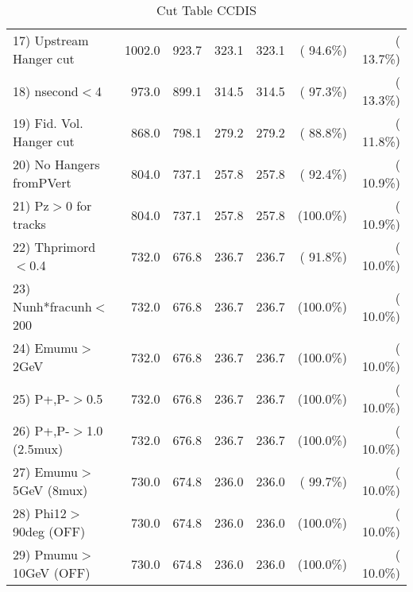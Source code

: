 \begin{table}[h!]
\begin{tabular}{||l||r|r|r|r|r|r||}
 17) Upstream Hanger cut  &       1002.0 &        923.7 &        323.1 &        323.1 & ( 94.6\%) & ( 13.7\%) \\
 18) nsecond$<$4          &        973.0 &        899.1 &        314.5 &        314.5 & ( 97.3\%) & ( 13.3\%) \\
 19) Fid. Vol. Hanger cut &        868.0 &        798.1 &        279.2 &        279.2 & ( 88.8\%) & ( 11.8\%) \\
 20) No Hangers fromPVert &        804.0 &        737.1 &        257.8 &        257.8 & ( 92.4\%) & ( 10.9\%) \\
 21) Pz$>$0 for tracks    &        804.0 &        737.1 &        257.8 &        257.8 & (100.0\%) & ( 10.9\%) \\
 22) Thprimord$<$0.4      &        732.0 &        676.8 &        236.7 &        236.7 & ( 91.8\%) & ( 10.0\%) \\
 23) Nunh*fracunh$<$200   &        732.0 &        676.8 &        236.7 &        236.7 & (100.0\%) & ( 10.0\%) \\
 24) Emumu$>$2GeV         &        732.0 &        676.8 &        236.7 &        236.7 & (100.0\%) & ( 10.0\%) \\
 25) P+,P-$>$0.5          &        732.0 &        676.8 &        236.7 &        236.7 & (100.0\%) & ( 10.0\%) \\
 26) P+,P-$>$1.0 (2.5mux) &        732.0 &        676.8 &        236.7 &        236.7 & (100.0\%) & ( 10.0\%) \\
 27) Emumu$>$5GeV  (8mux) &        730.0 &        674.8 &        236.0 &        236.0 & ( 99.7\%) & ( 10.0\%) \\
 28) Phi12$>$90deg  (OFF) &        730.0 &        674.8 &        236.0 &        236.0 & (100.0\%) & ( 10.0\%) \\
 29) Pmumu$>$10GeV  (OFF) &        730.0 &        674.8 &        236.0 &        236.0 & (100.0\%) & ( 10.0\%) \\
 \hline
 \hline
 \end{tabular}
 \caption{Cut Table  CCDIS    }
 \label{tab-cutcohjpsi-mumu_ccdis}
 \end{table}
